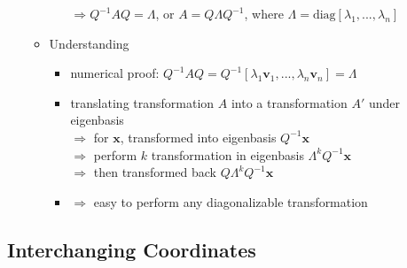 \begin{itemize}
\begin{itemize}
\begin{itemize}
		$\Rightarrow Q^{-1} A Q = \Lambda$, or $A = Q\Lambda Q^{-1}$, where $\Lambda=\text{diag}[\lambda_1,...,\lambda_n]$
		\end{itemize}
	\item Understanding
		\begin{itemize}
		\item numerical proof: $Q^{-1}AQ = Q^{-1}[\lambda_1 \mathbf v_1,...,\lambda_n\mathbf v_n] = \Lambda$
		\item translating transformation $A$ into a transformation $A'$ under eigenbasis \\
		$\Rightarrow$ for $\mathbf x$, transformed into eigenbasis $Q^{-1}\mathbf x$ \\
		$\Rightarrow$ perform $k$ transformation in eigenbasis $\Lambda^kQ^{-1}\mathbf x$ \\
		$\Rightarrow$ then transformed back $Q\Lambda^kQ^{-1} \mathbf x$
		\item $\Rightarrow$ easy to perform any diagonalizable transformation
		\end{itemize}
	\end{itemize}
\end{itemize}

\subsection{Interchanging Coordinates}
